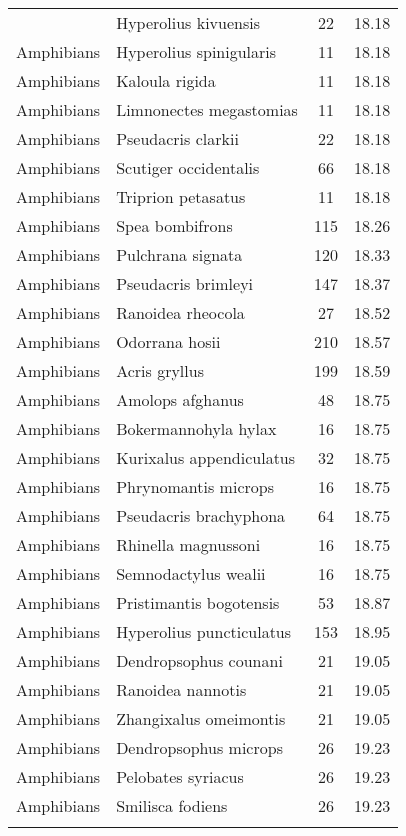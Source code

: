 \begin{longtable}{llcc}
{  Amphibians & Hyperolius kivuensis &  22 & 18.18 \\ 
  Amphibians & Hyperolius spinigularis &  11 & 18.18 \\ 
  Amphibians & Kaloula rigida &  11 & 18.18 \\ 
  Amphibians & Limnonectes megastomias &  11 & 18.18 \\ 
  Amphibians & Pseudacris clarkii &  22 & 18.18 \\ 
  Amphibians & Scutiger occidentalis &  66 & 18.18 \\ 
  Amphibians & Triprion petasatus &  11 & 18.18 \\ 
  Amphibians & Spea bombifrons & 115 & 18.26 \\ 
  Amphibians & Pulchrana signata & 120 & 18.33 \\ 
  Amphibians & Pseudacris brimleyi & 147 & 18.37 \\ 
  Amphibians & Ranoidea rheocola &  27 & 18.52 \\ 
  Amphibians & Odorrana hosii & 210 & 18.57 \\ 
  Amphibians & Acris gryllus & 199 & 18.59 \\ 
  Amphibians & Amolops afghanus &  48 & 18.75 \\ 
  Amphibians & Bokermannohyla hylax &  16 & 18.75 \\ 
  Amphibians & Kurixalus appendiculatus &  32 & 18.75 \\ 
  Amphibians & Phrynomantis microps &  16 & 18.75 \\ 
  Amphibians & Pseudacris brachyphona &  64 & 18.75 \\ 
  Amphibians & Rhinella magnussoni &  16 & 18.75 \\ 
  Amphibians & Semnodactylus wealii &  16 & 18.75 \\ 
  Amphibians & Pristimantis bogotensis &  53 & 18.87 \\ 
  Amphibians & Hyperolius puncticulatus & 153 & 18.95 \\ 
  Amphibians & Dendropsophus counani &  21 & 19.05 \\ 
  Amphibians & Ranoidea nannotis &  21 & 19.05 \\ 
  Amphibians & Zhangixalus omeimontis &  21 & 19.05 \\ 
  Amphibians & Dendropsophus microps &  26 & 19.23 \\ 
  Amphibians & Pelobates syriacus &  26 & 19.23 \\ 
  Amphibians & Smilisca fodiens &  26 & 19.23 \\ 
}
\end{longtable}
